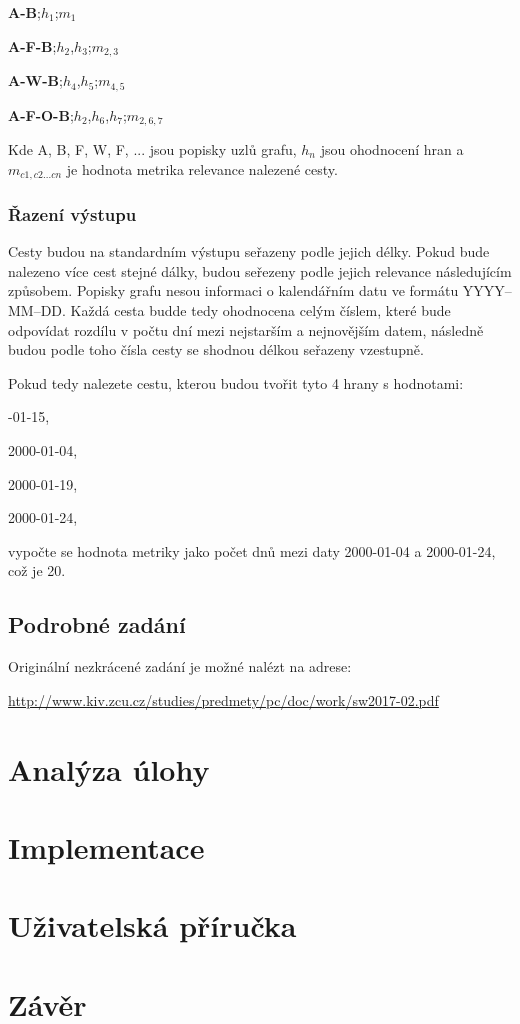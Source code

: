 \bigskip
\textbf{A-B};$h_{1}$;$m_{1}$

\textbf{A-F-B};$h_{2}$,$h_{3}$;$m_{2,3}$

\textbf{A-W-B};$h_{4}$,$h_{5}$;$m_{4,5}$

\textbf{A-F-O-B};$h_{2}$,$h_{6}$,$h_{7}$;$m_{2,6,7}$

\bigskip
Kde A, B, F, W, F, ... jsou popisky uzlů grafu, $h_{n}$ jsou ohodnocení hran a $m_{c1,c2...cn}$ je hodnota metrika relevance nalezené cesty.

\subsection{Řazení výstupu}
Cesty budou na standardním výstupu seřazeny podle jejich délky. Pokud bude nalezeno více cest stejné dálky, budou seřezeny podle jejich relevance následujícím způsobem. Popisky grafu nesou informaci o kalendářním datu ve formátu YYYY--MM--DD. Každá cesta budde tedy ohodnocena celým číslem, které bude odpovídat rozdílu v počtu dní mezi nejstarším a nejnovějším datem, následně budou podle toho čísla cesty se shodnou délkou seřazeny vzestupně.

\medskip
Pokud tedy nalezete cestu, kterou budou tvořit tyto 4 hrany s hodnotami:

-01-15,


2000-01-04,


2000-01-19,


2000-01-24,

\bigskip
vypočte se hodnota metriky jako počet dnů mezi daty 2000-01-04 a 2000-01-24, což je 20.

\section{Podrobné zadání}
Originální nezkrácené zadání je možné nalézt na adrese:

\medskip
\url{http://www.kiv.zcu.cz/studies/predmety/pc/doc/work/sw2017-02.pdf}

\setcounter{page}{1}

\chapter{Analýza úlohy}

\chapter{Implementace}

\chapter{Uživatelská příručka}

\chapter{Závěr}

